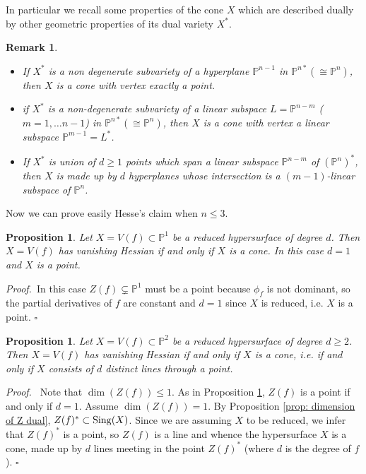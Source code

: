 \documentclass[11pt,a4paper]{amsart}
\newtheorem{rem}[theorem]{Remark}
\newtheorem{prop}[theorem]{Proposition}
\newcommand{\bprf}{{\it Proof.~}}
\newcommand{\eprf}{\hfill $\square$ \bigskip\par}
\newcommand{\erem}{\hfill $\square$}
\newcommand{\PP}{ \mathbb{P}}
\begin{document}
In particular we recall some properties of the cone $X$ which are
described dually by other geometric  properties of its dual
variety $X^*$.
\begin{rem}\label{rem: X* properties X cone} {\em
\begin{itemize}
\item [i)] \textit{If $X^*$ is a non degenerate subvariety of a
hyperplane $\PP^{n-1}$ in $\PP^{n*}(\cong\PP^{n})$, then $X$ is a
cone with vertex exactly a point.} \item [ii)] \textit{if $X^*$ is
a non-degenerate subvariety of a linear subspace $L=\PP^{n-m}$
($m=1,\ldots n-1$) in $\PP^{n*}(\cong\PP^{n})$, then $X$ is a cone
with vertex a linear subspace $\PP^{m-1}=L^*$.} \item [iii)]
\textit{If $X^*$ is union of $d\geq 1$ points which span a linear
subspace $\PP^{n-m}$ of $(\PP^n)^*$, then $X$ is made up by $d$
hyperplanes whose intersection is a $(m-1)$-linear subspace of
$\PP^{n}$.}
\end{itemize}
}\end{rem}

Now we can prove easily Hesse's claim when $n\leq 3$.

\begin{prop}\label{case1}
Let $X=V(f)\subset\mathbb{P}^1$ be a reduced hypersurface of degree $d$. Then $X=V(f)$ has vanishing Hessian if and only if $X$ is a cone. In this case $d=1$ and $X$ is a point.
\end{prop}
\bprf In this case $Z(f)\subsetneq \mathbb{P}^1$ must be a point
because $\phi_f$ is not dominant, so the partial derivatives of
$f$ are constant and $d=1$ since $X$ is reduced, i.e. $X$ is a
point. \erem

\begin{prop}
Let $X=V(f)\subset\mathbb{P}^2$ be a reduced hypersurface of
degree $d\geq 2$. Then $X=V(f)$ has vanishing Hessian if and only
if $X$ is a cone, i.e. if and only if $X$ consists of $d$ distinct
lines through a point.
\end{prop}
\bprf
Note that $\dim (Z(f))\leq 1$.
As in Proposition \ref{case1}, $Z(f)$ is a point if and only if $d=1$.
Assume $\dim (Z(f))=1$. By Proposition \ref{prop: dimension of Z dual}, $Z(f)^*\subset {\rm Sing}(X)$. Since we are assuming $X$ to be reduced,
we infer that $Z(f)^*$ is a point, so $Z(f)$ is a line and whence the hypersurface $X$ is a cone,  made up by $d$ lines meeting in the point $Z(f)^*$ (where $d$ is the degree of $f$).
\eprf
\end{document}
